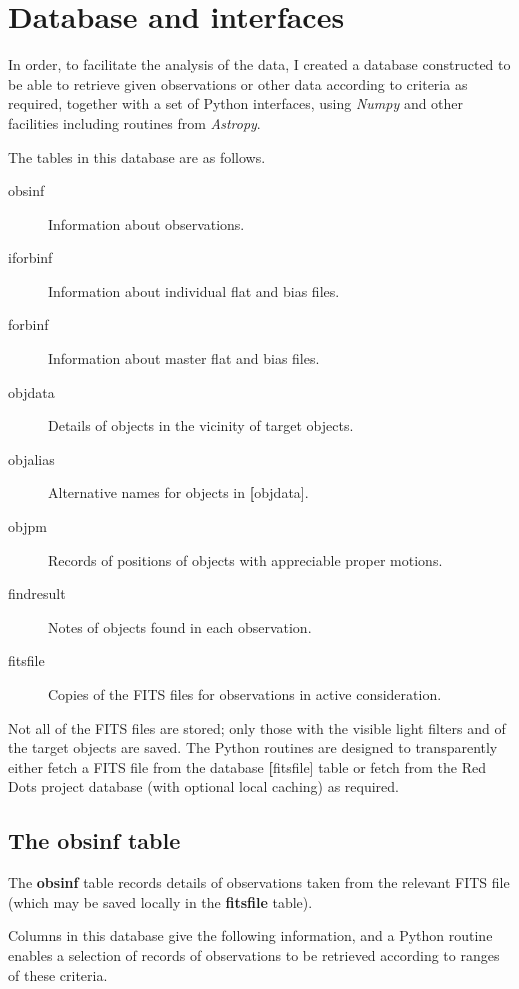 \appendix 
\section{Database and interfaces}
\protect\label{section:database}

In order, to facilitate the analysis of the data, I created a database
constructed to be able to retrieve given observations or other data according to
criteria as required, together with a set of Python interfaces, using
\textit{Numpy} and other facilities including routines from \textit{Astropy}.

The tables in this database are as follows.

\begin{description}
\item[obsinf] Information about observations.
\item[iforbinf] Information about individual flat and bias files.
\item[forbinf] Information about master flat and bias files.
\item[objdata] Details of objects in the vicinity of target objects.
\item[objalias] Alternative names for objects in \textbf[objdata].
\item[objpm] Records of positions of objects with appreciable proper motions.
\item[findresult] Notes of objects found in each observation.
\item[fitsfile] Copies of the FITS files for observations in active
consideration.
\end{description}

Not all of the FITS files are stored; only those with the visible light filters
and of the target {\rdwarf} objects are saved. The Python routines are designed
to transparently either fetch a FITS file from the database \textbf[fitsfile]
table or fetch from the Red Dots project database (with optional local
caching) as required.

\subsection{The obsinf table}
\protect\label{section:obsinftable}

The \textbf{obsinf} table records details of observations taken from the
relevant FITS file (which may be saved locally in the \textbf{fitsfile} table).

Columns in this database give the following information, and a Python routine
enables a selection of records of observations to be retrieved according to
ranges of these criteria.

